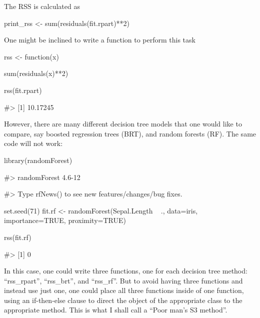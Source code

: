 The RSS is calculated as

\begin{Schunk}
\begin{Sinput}
print_rss <- sum(residuals(fit.rpart)**2)
\end{Sinput}
\end{Schunk}

One might be inclined to write a function to perform this task

\begin{Schunk}
\begin{Sinput}
rss <- function(x){
  
  sum(residuals(x)**2)
  
}

rss(fit.rpart)
\end{Sinput}
\begin{Soutput}
#> [1] 10.17245
\end{Soutput}
\end{Schunk}

However, there are many different decision tree models that one would
like to compare, say boosted regression trees (BRT), and random forests
(RF). The same code will not work:

\begin{Schunk}
\begin{Sinput}
library(randomForest)
\end{Sinput}
\begin{Soutput}
#> randomForest 4.6-12
\end{Soutput}
\begin{Soutput}
#> Type rfNews() to see new features/changes/bug fixes.
\end{Soutput}
\begin{Sinput}
set.seed(71)
fit.rf <- randomForest(Sepal.Length ~ ., data=iris, importance=TRUE,
                        proximity=TRUE)

rss(fit.rf)
\end{Sinput}
\begin{Soutput}
#> [1] 0
\end{Soutput}
\end{Schunk}

In this case, one could write three functions, one for each decision
tree method: ``rss\_rpart'', ``rss\_brt'', and ``rss\_rf''. But to avoid
having three functions and instead use just one, one could place all
three functions inside of one function, using an if-then-else clause to
direct the object of the appropriate class to the appropriate method.
This is what I shall call a ``Poor man's S3 method''.

